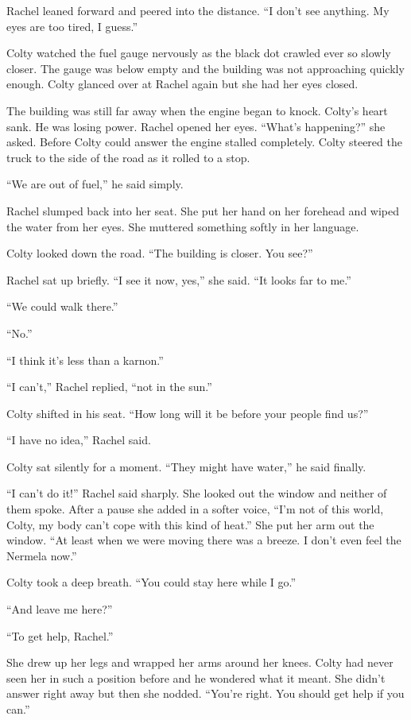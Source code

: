 Rachel leaned forward and peered into the distance. ``I don't see anything. My eyes are too
tired, I guess.''

Colty watched the fuel gauge nervously as the black dot crawled ever so slowly closer. The gauge
was below empty and the building was not approaching quickly enough. Colty glanced over at
Rachel again but she had her eyes closed.

The building was still far away when the engine began to knock. Colty's heart sank. He was
losing power. Rachel opened her eyes. ``What's happening?'' she asked. Before Colty could answer
the engine stalled completely. Colty steered the truck to the side of the road as it rolled to a
stop.

``We are out of fuel,'' he said simply.

Rachel slumped back into her seat. She put her hand on her forehead and wiped the water from her
eyes. She muttered something softly in her language.

Colty looked down the road. ``The building is closer. You see?''

Rachel sat up briefly. ``I see it now, yes,'' she said. ``It looks far to me.''

``We could walk there.''

``No.''

``I think it's less than a karnon.''

``I can't,'' Rachel replied, ``not in the sun.''

Colty shifted in his seat. ``How long will it be before your people find us?''

``I have no idea,'' Rachel said.

Colty sat silently for a moment. ``They might have water,'' he said finally.

``I can't do it!'' Rachel said sharply. She looked out the window and neither of them spoke.
After a pause she added in a softer voice, ``I'm not of this world, Colty, my body can't cope
with this kind of heat.'' She put her arm out the window. ``At least when we were moving there
was a breeze. I don't even feel the Nermela now.''

Colty took a deep breath. ``You could stay here while I go.''

``And leave me here?''

``To get help, Rachel.''

She drew up her legs and wrapped her arms around her knees. Colty had never seen her in such a
position before and he wondered what it meant. She didn't answer right away but then she nodded.
``You're right. You should get help if you can.''

